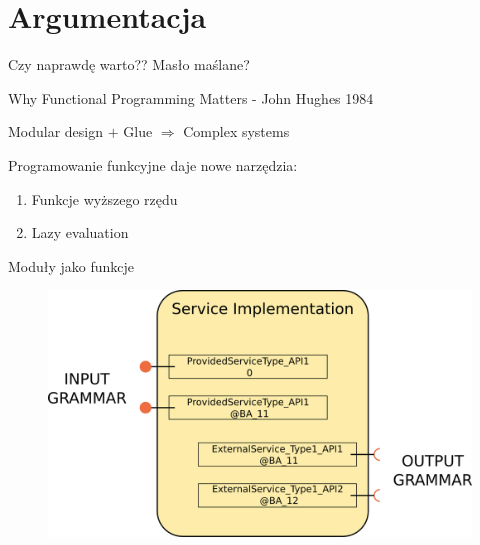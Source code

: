 \documentclass[smaller]{beamer}
\begin{document}
\section{Argumentacja}

\begin{frame}{Czy naprawdę warto??}
 Masło maślane?

\hfill

\pause

Why Functional Programming Matters - John Hughes 1984

\hfill

Modular design $+$ Glue $\Rightarrow$ Complex systems

\pause

\hfill

Programowanie funkcyjne daje nowe narzędzia:
\begin{enumerate}
 \item Funkcje wyższego rzędu 
 \item Lazy evaluation
\end{enumerate}

\end{frame}

\begin{frame}{Moduły jako funkcje}
 \begin{figure}
 \centering
 \includegraphics[width=1\textwidth]{serviceAsFunctionFig}
\end{figure}
\end{frame}
\end{document}
